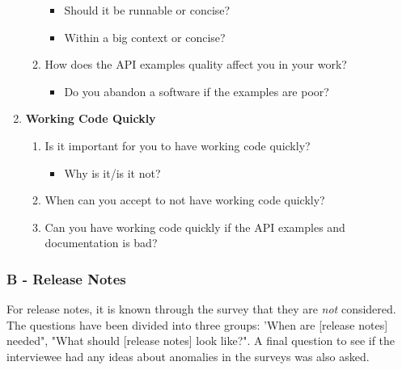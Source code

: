 \documentclass{cslthse-msc}
\begin{document}
\begin{enumerate}[label={A\Alph*}]
\begin{enumerate}[label={AC\arabic*}]
\begin{itemize}[label={-}]
                \item Should it be runnable or concise?
                \item Within a big context or concise?
            \end{itemize}
            \item	How does the API examples quality affect you in your work?
            \begin{itemize}[label={-}]
                \item Do you abandon a software if the examples are poor?
            \end{itemize}
        \end{enumerate}

        \item\textbf{Working Code Quickly}
        \begin{enumerate}[label={AD\arabic*}]
            \item Is it important for you to have working code quickly?
            \begin{itemize}[label={-}]
                \item Why is it/is it not?
            \end{itemize}
            \item When can you accept to not have working code quickly?
            \item Can you have working code quickly if the API examples and documentation is bad?
        \end{enumerate}
    \end{enumerate}

    \subsubsection{B - Release Notes}
    For release notes, it is known through the survey that they are \textit{not} considered.
    The questions have been divided into three groups: 'When are [release notes] needed",
    "What should [release notes] look like?". A final question to see if the interviewee had any ideas about anomalies in the surveys was also asked.
\end{document}
